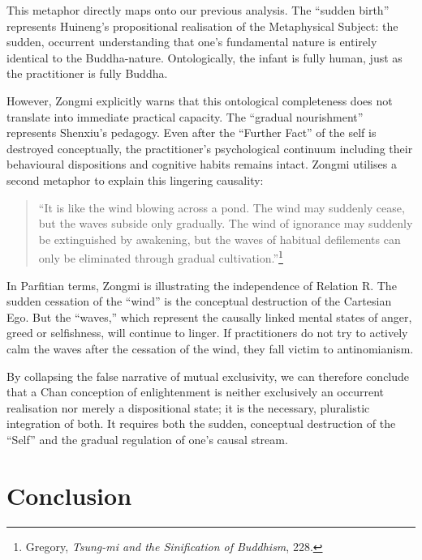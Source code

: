 \noindent This metaphor directly maps onto our previous analysis. The ``sudden
birth'' represents Huineng's propositional realisation of the
Metaphysical Subject: the sudden, occurrent understanding that one's
fundamental nature is entirely identical to the Buddha-nature.
Ontologically, the infant is fully human, just as the practitioner is
fully Buddha.

However, Zongmi explicitly warns that this ontological completeness does
not translate into immediate practical capacity. The ``gradual
nourishment'' represents Shenxiu's pedagogy. Even after the ``Further
Fact'' of the self is destroyed conceptually, the practitioner's
psychological continuum including their behavioural dispositions and
cognitive habits remains intact. Zongmi utilises a second metaphor to
explain this lingering causality:

\begin{quote}
    ``It is like the wind blowing across a pond. The wind may suddenly
cease, but the waves subside only gradually. The wind of ignorance may
suddenly be extinguished by awakening, but the waves of habitual
defilements can only be eliminated through gradual
cultivation.''\footnote{Gregory, \emph{Tsung-mi and the Sinification of
  Buddhism}, 228.}
\end{quote}

\noindent In Parfitian terms, Zongmi is illustrating the independence of Relation
R. The sudden cessation of the ``wind'' is the conceptual destruction of
the Cartesian Ego. But the ``waves,'' which represent the causally
linked mental states of anger, greed or selfishness, will continue to
linger. If practitioners do not try to actively calm the waves after the
cessation of the wind, they fall victim to antinomianism.

By collapsing the false narrative of mutual exclusivity, we can
therefore conclude that a Chan conception of enlightenment is neither
exclusively an occurrent realisation nor merely a dispositional state;
it is the necessary, pluralistic integration of both. It requires both
the sudden, conceptual destruction of the ``Self'' and the gradual
regulation of one's causal stream.

\section{Conclusion}

